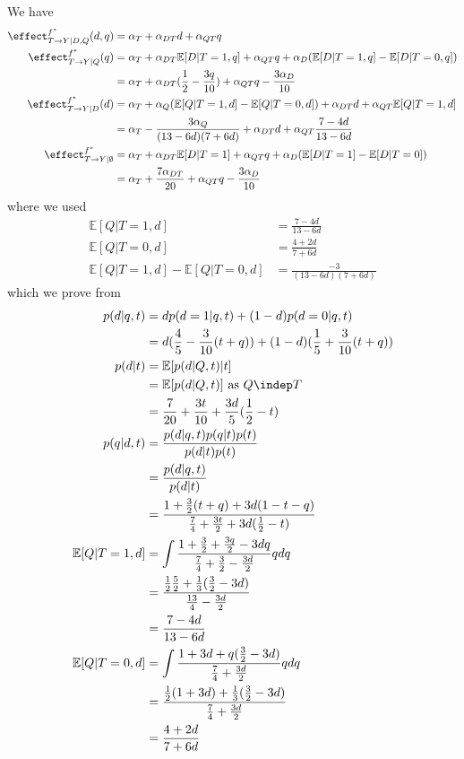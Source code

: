 We have
\begin{align*}
    \effect^{f^*}_{T \rightarrow Y | D, Q}(d,q) &= \alpha_T + \alpha_{DT}d + \alpha_{QT}q \\
    \effect^{f^*}_{T \rightarrow Y | Q}(q)
    &= \alpha_T + \alpha_{DT}\mathbb{E}[D|T=1,q] + \alpha_{QT}q + \alpha_D(\mathbb{E}[D|T=1,q] - \mathbb{E}[D|T=0,q])   \\
    &= \alpha_T + \alpha_{DT}(\frac{1}{2} - \frac{3q}{10}) + \alpha_{QT}q - \frac{3\alpha_D}{10} \\
    \effect^{f^*}_{T \rightarrow Y | D}(d) &= \alpha_T + \alpha_Q(\mathbb{E}[Q|T=1,d] - \mathbb{E}[Q|T=0,d] ) +  \alpha_{DT}d + \alpha_{QT}\mathbb{E}[Q|T=1,d] \\
    &= \alpha_T - \frac{3\alpha_Q}{(13 - 6d)(7 + 6d)} +  \alpha_{DT}d + \alpha_{QT}\frac{7 - 4d}{13 - 6d} \\
    \effect^{f^*}_{T \rightarrow Y | \emptyset}
    &= \alpha_T + \alpha_{DT}\mathbb{E}[D|T=1] + \alpha_{QT}q + \alpha_D(\mathbb{E}[D|T=1] - \mathbb{E}[D|T=0])   \\
        &= \alpha_T + \frac{7\alpha_{DT}}{20} + \alpha_{QT}q - \frac{3\alpha_D}{10}   \\
\end{align*}
where we used
\begin{align*}
    \mathbb{E}[Q|T=1,d] &= \frac{7 - 4d}{13 -6d} \\
    \mathbb{E}[Q|T=0,d] &= \frac{4 + 2d}{7 + 6d} \\
    \mathbb{E}[Q|T=1,d] - \mathbb{E}[Q|T=0,d] &= \frac{-3}{(13 - 6d)(7 + 6d)} 
\end{align*}
which we prove from
\begin{align*}
    p(d|q,t)
    &= dp(d=1|q,t) + (1-d)p(d=0|q,t) \\
    &= d(\frac{4}{5} - \frac{3}{10}(t+q)) + (1-d)(\frac{1}{5} + \frac{3}{10}(t+q) ) \\
    p(d|t)
    &= \mathbb{E}[p(d|Q,t) | t] \\
    &= \mathbb{E}[p(d|Q,t)] \text{ as } Q \indep T \\
    &= \frac{7}{20} + \frac{3t}{10} + \frac{3d}{5}(\frac{1}{2} - t) \\
    p(q|d,t)
    &= \frac{p(d|q,t)p(q|t)p(t)}{p(d|t)p(t)} \\
    &= \frac{p(d|q,t)}{p(d|t)} \\
    &= \frac{1 + \frac{3}{2}(t+q) + 3d(1 - t - q)}{\frac{7}{4} + \frac{3t}{2} + 3d(\frac{1}{2} - t)} \\
    \mathbb{E}[Q|T=1,d]
    &= \int \frac{1 + \frac{3}{2} + \frac{3q}{2} - 3dq}{\frac{7}{4} + \frac{3}{2} - \frac{3d}{2}}q dq \\
    &= \frac{\frac{1}{2}\frac{5}{2} + \frac{1}{3}(\frac{3}{2} - 3d)}{\frac{13}{4} - \frac{3d}{2}} \\
    &= \frac{7 - 4d}{13 - 6d} \\
    \mathbb{E}[Q|T=0,d]
    &= \int \frac{1 + 3d + q(\frac{3}{2} - 3d)}{\frac{7}{4} + \frac{3d}{2}}q dq \\
    &= \frac{\frac{1}{2}(1 + 3d) + \frac{1}{3}(\frac{3}{2} - 3d)}{\frac{7}{4} + \frac{3d}{2}} \\
    &= \frac{4 + 2d}{7 + 6d}
\end{align*}
